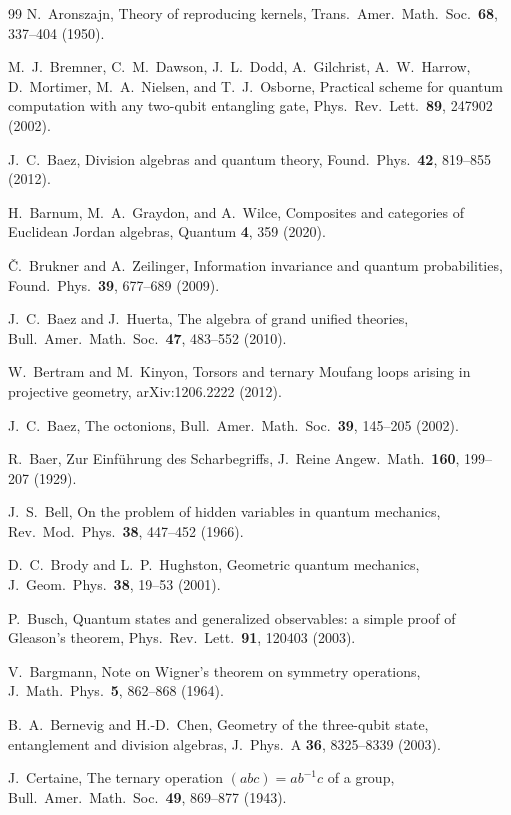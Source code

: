 \documentclass[aps,pra,onecolumn,superscriptaddress,nofootinbib,10pt]{revtex4-2}
\theoremstyle{definition}
\theoremstyle{remark}
\begin{document}
\begin{thebibliography}{99}
 N.~Aronszajn, Theory of reproducing kernels, Trans.\ Amer.\ Math.\ Soc.\ \textbf{68}, 337--404 (1950).

 M.~J.~Bremner, C.~M.~Dawson, J.~L.~Dodd, A.~Gilchrist, A.~W.~Harrow, D.~Mortimer, M.~A.~Nielsen, and T.~J.~Osborne, Practical scheme for quantum computation with any two-qubit entangling gate, Phys.\ Rev.\ Lett.\ \textbf{89}, 247902 (2002).

 J.~C.~Baez, Division algebras and quantum theory, Found.\ Phys.\ \textbf{42}, 819--855 (2012).

 H.~Barnum, M.~A.~Graydon, and A.~Wilce, Composites and categories of Euclidean Jordan algebras, Quantum \textbf{4}, 359 (2020).

 \v{C}.~Brukner and A.~Zeilinger, Information invariance and quantum probabilities, Found.\ Phys.\ \textbf{39}, 677--689 (2009).

 J.~C.~Baez and J.~Huerta, The algebra of grand unified theories, Bull.\ Amer.\ Math.\ Soc.\ \textbf{47}, 483--552 (2010).

 W.~Bertram and M.~Kinyon, Torsors and ternary Moufang loops arising in projective geometry, arXiv:1206.2222 (2012).

 J.~C.~Baez, The octonions, Bull.\ Amer.\ Math.\ Soc.\ \textbf{39}, 145--205 (2002).

 R.~Baer, Zur Einf\"uhrung des Scharbegriffs, J.\ Reine Angew.\ Math.\ \textbf{160}, 199--207 (1929).

 J.~S.~Bell, On the problem of hidden variables in quantum mechanics, Rev.\ Mod.\ Phys.\ \textbf{38}, 447--452 (1966).

 D.~C.~Brody and L.~P.~Hughston, Geometric quantum mechanics, J.\ Geom.\ Phys.\ \textbf{38}, 19--53 (2001).

 P.~Busch, Quantum states and generalized observables: a simple proof of Gleason's theorem, Phys.\ Rev.\ Lett.\ \textbf{91}, 120403 (2003).

 V.~Bargmann, Note on Wigner's theorem on symmetry operations, J.\ Math.\ Phys.\ \textbf{5}, 862--868 (1964).

 B.~A.~Bernevig and H.-D.~Chen, Geometry of the three-qubit state, entanglement and division algebras, J.\ Phys.\ A \textbf{36}, 8325--8339 (2003).

 J.~Certaine, The ternary operation $(abc)=ab^{-1}c$ of a group, Bull.\ Amer.\ Math.\ Soc.\ \textbf{49}, 869--877 (1943).


\end{thebibliography}
\end{document}
